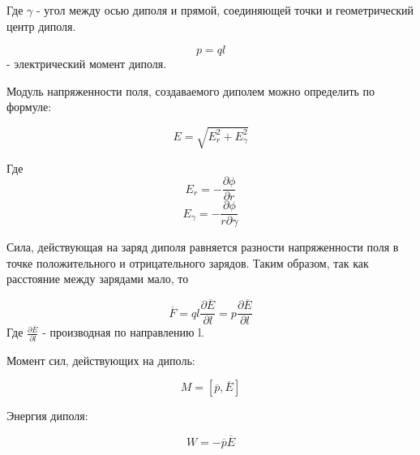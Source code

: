 Где $\gamma$ - угол между осью диполя и прямой, соединяющей точки и геометрический центр диполя.

\[p = ql\]
 - электрический момент диполя.

Модуль напряженности поля, создаваемого диполем можно определить по формуле:

\begin{equation}
E = \sqrt{E_r^2 + E_\gamma^2}
\end{equation}

Где
\[E_r = - \frac{\partial \phi}{\partial r}\]
\[E_\gamma = - \frac{\partial \phi}{r \partial \gamma}\]

Сила, действующая на заряд диполя равняется разности напряженности поля в точке положительного и отрицательного зарядов.
Таким образом, так как расстояние между зарядами мало, то

\begin{equation}
\overline{F} = q l \frac{\partial \overline{E}}{\partial l} = p \frac{\partial \overline{E}}{\partial l}
\end{equation}
Где $\frac{\partial \overline{E}}{\partial l}$ - производная по направлению l.

Момент сил, действующих на диполь:


\begin{equation}
M = [\overline{p},\overline{E}]
\end{equation}

Энергия диполя:

\begin{equation}
W = -\overline{p} \overline{E}
\end{equation}



